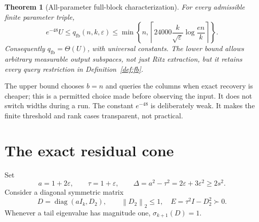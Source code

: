 \documentclass[11pt]{article}
\newtheorem{theorem}{Theorem}[section]
\theoremstyle{definition}
\newcommand{\diag}{\operatorname{diag}}
\newcommand{\qfb}{q_{\mathrm{fb}}}
\newcommand{\norm}[1]{\left\lVert#1\right\rVert}
\begin{document}
\begin{theorem}[All-parameter full-block characterization]\label{thm:fb}
For every admissible finite parameter triple,
\begin{equation}\label{eq:fb-bound}
e^{-48}U\le\qfb(n,k,\varepsilon)
\le\min\left\{n,\left\lceil24000\frac{k}{\sqrt\varepsilon}
\log\frac{en}{k}\right\rceil\right\}.
\end{equation}
Consequently $\qfb=\Theta(U)$, with universal constants. The lower bound allows arbitrary measurable output subspaces, not just Ritz extraction, but it retains every query restriction in Definition~\ref{def:fb}.
\end{theorem}

The upper bound chooses $b=n$ and queries the columns when exact recovery is cheaper; this is a permitted choice made before observing the input. It does not switch widths during a run. The constant $e^{-48}$ is deliberately weak. It makes the finite threshold and rank cases transparent, not practical.

\section{The exact residual cone}\label{sec:cone}
Set
\[
a=1+2\varepsilon,\qquad \tau=1+\varepsilon,\qquad
\Delta=a^2-\tau^2=2\varepsilon+3\varepsilon^2\ge2s^2.
\]
Consider a diagonal symmetric matrix
\begin{equation}\label{eq:D}
D=\diag(aI_k,D_2),\qquad \norm{D_2}_2\le1,
\quad E=\tau^2I-D_2^2\succ0.
\end{equation}
Whenever a tail eigenvalue has magnitude one, $\sigma_{k+1}(D)=1$.
\end{document}
